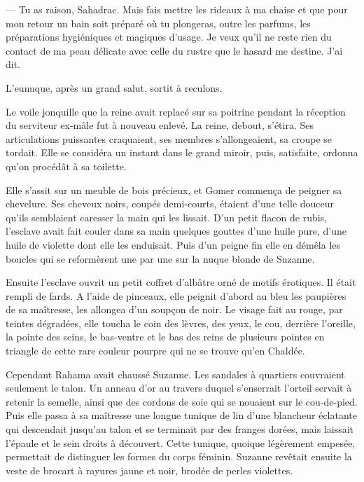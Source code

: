 \documentclass[a4paper, 11pt, oneside, polutonikogreek, french]{article}
\begin{document}
--- Tu as raison, Sahadrac. Mais fais mettre les rideaux à ma chaise et que pour mon retour un bain soit préparé où tu plongeras, outre les parfums, les préparations hygiéniques et magiques d'usage. Je veux qu'il ne reste rien du contact de ma peau délicate avec celle du rustre que le hasard me destine. J'ai dit.

L'eunuque, après un grand salut, sortit à reculons.

\bigskip
\centerline{\EightStarTaper}
\centerline{\EightStarTaper\EightStarTaper}
\bigskip

Le voile jonquille que la reine avait replacé sur sa poitrine pendant la réception du serviteur ex-mâle fut à nouveau enlevé. La reine, debout, s'étira. Ses articulations puissantes craquaient, ses membres s'allongeaient, sa croupe se tordait. Elle se considéra un instant dans le grand miroir, puis, satisfaite, ordonna qu'on procédât à sa toilette.

Elle s'assit sur un meuble de bois précieux, et Gomer commença de peigner sa chevelure. Ses cheveux noirs, coupés demi-courts, étaient d'une telle douceur qu'ils semblaient caresser la main qui les lissait. D'un petit flacon de rubis, l'esclave avait fait couler dans sa main quelques gouttes d'une huile pure, d'une huile de violette dont elle les enduisait. Puis d'un peigne fin elle en démêla les boucles qui se reformèrent une par une sur la nuque blonde de Suzanne.

Ensuite l'esclave ouvrit un petit coffret d'albâtre orné de motifs érotiques. Il était rempli de fards. A l'aide de pinceaux, elle peignit d'abord au bleu les paupières de sa maîtresse, les allongea d'un soupçon de noir. Le visage fait au rouge, par teintes dégradées, elle toucha le coin des lèvres, des yeux, le cou, derrière l'oreille, la pointe des seins, le bas-ventre et le bas des reins de plusieurs pointes en triangle de cette rare couleur pourpre qui ne se trouve qu'en Chaldée.

Cependant Rahama avait chaussé Suzanne. Les sandales à quartiers couvraient seulement le talon. Un anneau d'or au travers duquel s'enserrait l'orteil servait à retenir la semelle, ainsi que des cordons de soie qui se nouaient sur le cou-de-pied. Puis elle passa à sa maîtresse une longue tunique de lin d'une blancheur éclatante qui descendait jusqu'au talon et se terminait par des franges dorées, mais laissait l'épaule et le sein droits à découvert. Cette tunique, quoique légèrement empesée, permettait de distinguer les formes du corps féminin. Suzanne revêtait ensuite la veste de brocart à rayures jaune et noir, brodée de perles violettes.
\end{document}
